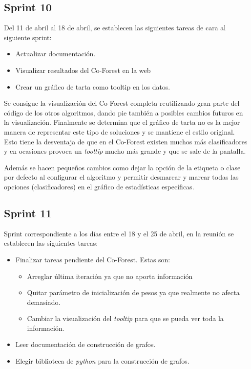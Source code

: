 \subsection{Sprint 10}
Del 11 de abril al 18 de abril, se establecen las siguientes tareas de cara al siguiente sprint:
 \begin{itemize}
	\item Actualizar documentación.
	\item Visualizar resultados del Co-Forest en la web
	\item Crear un gráfico de tarta como tooltip en los datos.
\end{itemize}
Se consigue la visualización del Co-Forest completa reutilizando gran parte del código de los otros algoritmos, dando pie también a posibles cambios futuros en la visualización. Finalmente se determina que el gráfico de tarta no es la mejor manera de representar este tipo de soluciones y se mantiene el estilo original. Esto tiene la desventaja de que en el Co-Forest existen muchos más clasificadores y en ocasiones provoca un \textit{tooltip} mucho más grande y que se sale de la pantalla. 

Además se hacen pequeños cambios como dejar la opción de la etiqueta o clase por defecto al configurar el algoritmo y permitir desmarcar y marcar todas las opciones (clasificadores) en el gráfico de estadísticas específicas.

\subsection{Sprint 11}
Sprint correspondiente a los días entre el 18 y el 25 de abril, en la reunión se establecen las siguientes tareas:
 \begin{itemize}
	\item Finalizar tareas pendiente del Co-Forest. Estas son:
	\begin{itemize}
		\item Arreglar última iteración ya que no aporta información
		\item Quitar parámetro de inicialización de pesos ya que realmente no afecta demasiado.
		\item Cambiar la visualización del \textit{tooltip} para que se pueda ver toda la información.
	\end{itemize}
	\item Leer documentación de construcción de grafos.
	\item Elegir biblioteca de \textit{python} para la construcción de grafos.
\end{itemize}

